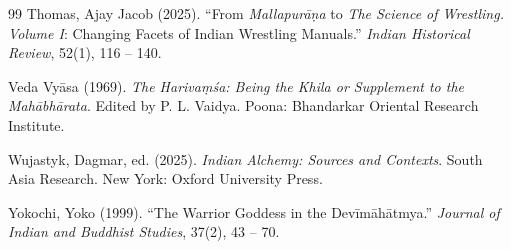 \documentclass[11pt,twoside,letterpaper]{article}
\begin{document}
\begin{thebibliography}{99}
Thomas, Ajay Jacob (2025). ``From \textit{Mallapur\={a}\d{n}a} to \textit{The Science of Wrestling. Volume I}: Changing Facets of Indian Wrestling Manuals.'' \textit{Indian Historical Review}, 52(1), 116 -- 140.

Veda Vy\={a}sa (1969). \textit{The Hariva\d{m}\'sa: Being the Khila or Supplement to the Mah\={a}bh\={a}rata}. Edited by P. L. Vaidya. Poona: Bhandarkar Oriental Research Institute.

Wujastyk, Dagmar, ed. (2025). \textit{Indian Alchemy: Sources and Contexts}. South Asia Research. New York: Oxford University Press.

Yokochi, Yoko (1999). ``The Warrior Goddess in the Dev\={i}m\={a}h\={a}tmya.'' \textit{Journal of Indian and Buddhist Studies}, 37(2), 43 -- 70.

\end{thebibliography}
\end{document}
